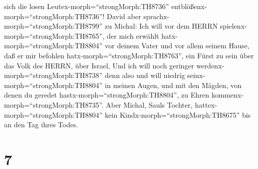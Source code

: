 sich die losen Leutex-morph=``strongMorph:TH8736''
entblößenx-morph=``strongMorph:TH8736''!  David aber
sprachx-morph=``strongMorph:TH8799'' zu Michal: Ich will vor dem HERRN
spielenx-morph=``strongMorph:TH8765'', der mich erwählt
hatx-morph=``strongMorph:TH8804'' vor deinem Vater und vor allem seinem
Hause, daß er mir befohlen hatx-morph=``strongMorph:TH8763'', ein Fürst
zu sein über das Volk des HERRN, über Israel,  Und ich will
noch geringer werdenx-morph=``strongMorph:TH8738'' denn also und will
niedrig seinx-morph=``strongMorph:TH8804'' in meinen Augen, und mit den
Mägden, von denen du geredet hastx-morph=``strongMorph:TH8804'', zu
Ehren kommenx-morph=``strongMorph:TH8735''.  Aber Michal,
Sauls Tochter, hattex-morph=``strongMorph:TH8804'' kein
Kindx-morph=``strongMorph:TH8675'' bis an den Tag ihres Todes.

\hypertarget{section-6}{%
\section{7}\label{section-6}}


